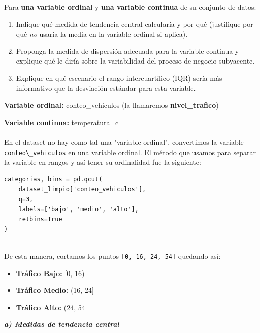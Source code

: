 \documentclass[11pt]{article}
\begin{document}
\begin{pregunta}
Para \textbf{una variable ordinal} y \textbf{una variable continua} de su conjunto de datos:
\begin{enumerate}[label=\alph*)]
  \item Indique qué medida de tendencia central calcularía y por qué (justifique por qué \emph{no} usaría la media en la variable ordinal si aplica).
  \item Proponga la medida de dispersión adecuada para la variable continua y explique qué le diría sobre la variabilidad del proceso de negocio subyacente.
  \item Explique en qué escenario el rango intercuartílico (IQR) sería más informativo que la desviación estándar para esta variable.
\end{enumerate}
\end{pregunta}

\textbf{Variable ordinal:} conteo\_vehiculos (la llamaremos\textbf{ nivel\_trafico})

\textbf{Variable continua:} temperatura\_c\\ \\
En el dataset no hay como tal una "variable ordinal", convertimos la variable \verb|conteo\_vehiculos| en una variable ordinal. El método que usamos para separar la variable en rangos y así tener su ordinalidad fue la siguiente:
\begin{verbatim}
categorias, bins = pd.qcut(
    dataset_limpio['conteo_vehiculos'],
    q=3,
    labels=['bajo', 'medio', 'alto'],
    retbins=True
)
\end{verbatim}\\
De esta manera, cortamos los puntos \verb|[0, 16, 24, 54]| quedando así:
\begin{itemize}
    \item \textbf{Tráfico Bajo:} [0, 16)
    \item \textbf{Tráfico Medio:} (16, 24]
    \item \textbf{Tráfico Alto:} (24, 54]
\end{itemize} 
\textit{\textbf{a) Medidas de tendencia central}}
\end{document}
